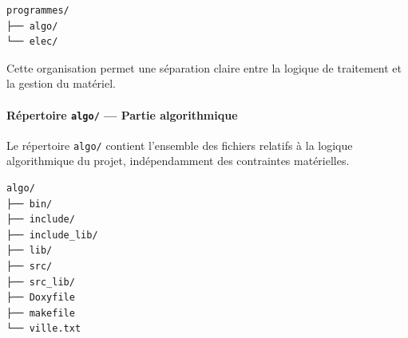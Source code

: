 \begin{verbatim}
programmes/
├── algo/
└── elec/
\end{verbatim}

Cette organisation permet une séparation claire entre la logique de traitement et la gestion du matériel.

\paragraph{Répertoire \texttt{algo/} — Partie algorithmique}

Le répertoire \texttt{algo/} contient l’ensemble des fichiers relatifs à la logique algorithmique du projet,
indépendamment des contraintes matérielles.

\begin{verbatim}
algo/
├── bin/
├── include/
├── include_lib/
├── lib/
├── src/
├── src_lib/
├── Doxyfile
├── makefile
└── ville.txt
\end{verbatim}

